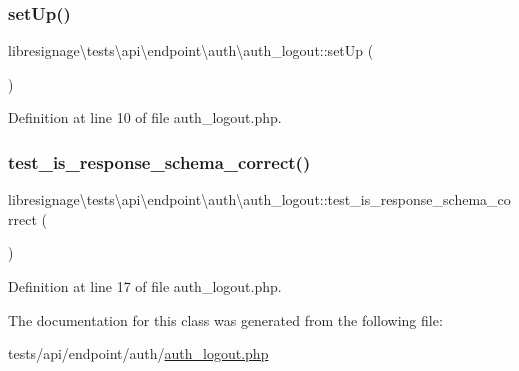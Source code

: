 \subsubsection{\texorpdfstring{set\+Up()}{setUp()}}
{\footnotesize\ttfamily libresignage\textbackslash{}tests\textbackslash{}api\textbackslash{}endpoint\textbackslash{}auth\textbackslash{}auth\+\_\+logout\+::set\+Up (\begin{DoxyParamCaption}{ }\end{DoxyParamCaption})}



Definition at line 10 of file auth\+\_\+logout.\+php.

\mbox{\label{classlibresignage_1_1tests_1_1api_1_1endpoint_1_1auth_1_1auth__logout_a956d2ba3ade150d26d0400fcabe7730b}} 
\subsubsection{\texorpdfstring{test\+\_\+is\+\_\+response\+\_\+schema\+\_\+correct()}{test\_is\_response\_schema\_correct()}}
{\footnotesize\ttfamily libresignage\textbackslash{}tests\textbackslash{}api\textbackslash{}endpoint\textbackslash{}auth\textbackslash{}auth\+\_\+logout\+::test\+\_\+is\+\_\+response\+\_\+schema\+\_\+correct (\begin{DoxyParamCaption}{ }\end{DoxyParamCaption})}



Definition at line 17 of file auth\+\_\+logout.\+php.



The documentation for this class was generated from the following file\+:\begin{DoxyCompactItemize}
\item 
tests/api/endpoint/auth/\hyperlink{tests_2api_2endpoint_2auth_2auth__logout_8php}{auth\+\_\+logout.\+php}\end{DoxyCompactItemize}
